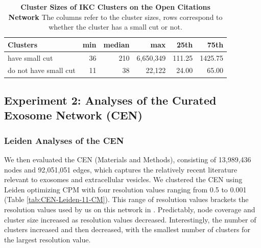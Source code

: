 \documentclass[11pt]{article}   	%
\begin{document}
\begin{table}[ht]
\centering
\begin{tabular}{lrrrrr}
    \hline
Clusters              & min & median & max    & 25th    & 75th    \\
    \hline
have small cut    & 36  & 210    & 6,650,349 & 111.25 & 1425.75 \\
do not have small cut & 11  & 38     & 22,122  & 24.00     & 65.00         \\
    \hline
\end{tabular}
\caption[Cluster Sizes of IKC Clusters on the Open Citations Network]{\textbf{ Cluster Sizes of IKC Clusters on the Open Citations Network}  The columns refer to the  cluster sizes, rows correspond to whether the cluster has a small cut or not.}
\label{tab:IKC-OC-sizes}
\end{table}





\clearpage
\subsection{Experiment 2: Analyses of the Curated Exosome Network (CEN)}

\subsubsection{Leiden Analyses of the CEN}

We then evaluated the CEN (Materials and Methods), consisting of 13,989,436 nodes and 92,051,051 edges, which captures the relatively recent literature relevant to exosomes and extracellular vesicles. We clustered the CEN using Leiden optimizing CPM with  four resolution values ranging from 0.5 to 0.001 (Table \ref{tab:CEN-Leiden-11-CM}).
This range of resolution values brackets the resolution values used by us on this network in   \cite{Jakatdar_2022}.
Predictably, node coverage and cluster size increased as resolution values  decreased.
Interestingly, the number of clusters increased and then decreased, with the smallest number of clusters for the largest
resolution value.
\end{document}
